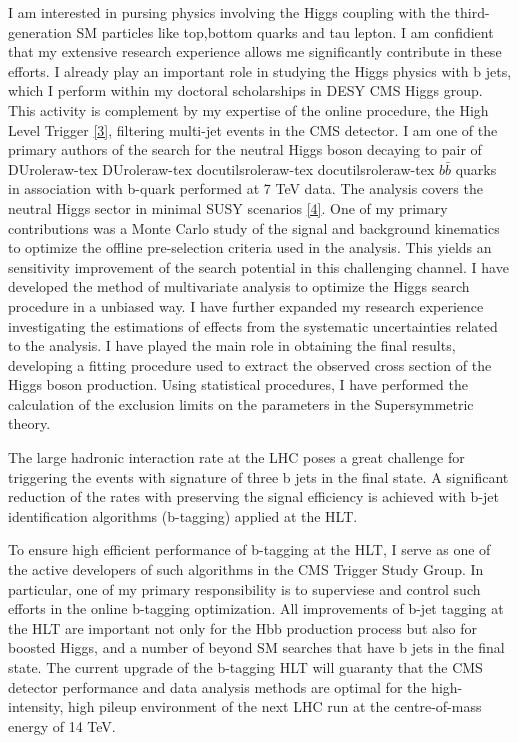 \documentclass[a4paper]{article}
\providecommand*{\DUrole}[2]{%
  \ifcsname DUrole#1\endcsname%
    \csname DUrole#1\endcsname{#2}%
  \else%
    \ifcsname docutilsrole#1\endcsname%
      \csname docutilsrole#1\endcsname{#2}%
    \else%
      #2%
    \fi%
  \fi%
}
\begin{document}
I am interested in pursing physics involving the Higgs coupling with the third-generation
SM particles like top,bottom quarks and tau lepton. I am confidient that my
extensive research experience allows me significantly contribute in these efforts.
I already play an important role in studying the Higgs physics  with b jets, which I perform within
my doctoral scholarships in DESY CMS Higgs group.  This activity is complement by
my expertise of the online procedure, the High Level Trigger \hyperlink{ref3}{[3]},
filtering multi-jet events
in the CMS detector. I am one of the primary authors of the search for the neutral Higgs boson decaying
to pair of \DUrole{raw-tex}{$b\bar{b}$}  quarks in association with b-quark  performed at 7 TeV
data. The analysis covers the neutral Higgs sector in minimal SUSY scenarios \hyperlink{ref4}{[4]}.
One of my primary contributions was a Monte Carlo study of the signal and background kinematics
to optimize the offline pre-selection  criteria used in the analysis. This yields
an sensitivity improvement of the search potential in this challenging channel.
I have developed the method of multivariate analysis to optimize the Higgs search procedure
in a unbiased way.
I have further expanded my research experience investigating the estimations of
effects from the  systematic uncertainties  related to the analysis.
I have played the main role in
obtaining the final results, developing
a fitting procedure used to extract the  observed cross section of the Higgs boson production.
Using statistical procedures,
I have performed the calculation of the exclusion limits on the parameters in the Supersymmetric theory.

The large hadronic interaction rate at the LHC  poses a great challenge
for triggering the events with
signature  of three b jets in the final state.
A significant reduction of the rates with preserving the signal efficiency
is achieved  with b-jet identification algorithms (b-tagging) applied at the HLT.

To ensure high efficient performance of b-tagging at the HLT,  I
serve as one of the active developers of such algorithms in the CMS Trigger Study Group.
In particular, one of my primary responsibility is to superviese
and control such efforts in the online b-tagging optimization.
All  improvements of b-jet tagging at the HLT are important not only for the
Hbb production process but also for  boosted Higgs, and a number of beyond
SM searches that have b jets in the final state.
The current upgrade of the b-tagging  HLT will guaranty that the CMS detector performance
and data analysis methods are optimal for the high-intensity, high pileup
environment of the next LHC run at the centre-of-mass energy of 14 TeV.
\end{document}
